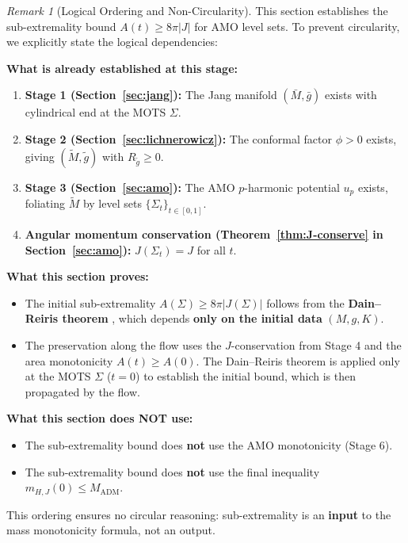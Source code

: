 \documentclass[12pt]{article}
\theoremstyle{plain}
\theoremstyle{definition}
\theoremstyle{remark}
\newtheorem{remark}[theorem]{Remark}
\begin{document}
\begin{remark}[Logical Ordering and Non-Circularity]
This section establishes the sub-extremality bound $A(t) \geq 8\pi|J|$ for AMO level sets. To prevent circularity, we explicitly state the logical dependencies:

\textbf{What is already established at this stage:}
\begin{enumerate}[label=(\arabic*)]
    \item \textbf{Stage 1 (Section~\ref{sec:jang}):} The Jang manifold $(\bar{M}, \bar{g})$ exists with cylindrical end at the MOTS $\Sigma$.
    \item \textbf{Stage 2 (Section~\ref{sec:lichnerowicz}):} The conformal factor $\phi > 0$ exists, giving $(\tilde{M}, \tilde{g})$ with $R_{\tilde{g}} \geq 0$.
    \item \textbf{Stage 3 (Section~\ref{sec:amo}):} The AMO $p$-harmonic potential $u_p$ exists, foliating $\tilde{M}$ by level sets $\{\Sigma_t\}_{t \in [0,1]}$.
    \item \textbf{Angular momentum conservation (Theorem~\ref{thm:J-conserve} in Section~\ref{sec:amo}):} $J(\Sigma_t) = J$ for all $t$.
\end{enumerate}

\textbf{What this section proves:}
\begin{itemize}
    \item The initial sub-extremality $A(\Sigma) \geq 8\pi|J(\Sigma)|$ follows from the \textbf{Dain--Reiris theorem} \cite{dain2011}, which depends \textbf{only on the initial data} $(M, g, K)$.
    \item The preservation along the flow uses the $J$-conservation from Stage 4 and the area monotonicity $A(t) \ge A(0)$. The Dain--Reiris theorem is applied only at the MOTS $\Sigma$ ($t=0$) to establish the initial bound, which is then propagated by the flow.
\end{itemize}

\textbf{What this section does NOT use:}
\begin{itemize}
    \item The sub-extremality bound does \textbf{not} use the AMO monotonicity (Stage 6).
    \item The sub-extremality bound does \textbf{not} use the final inequality $m_{H,J}(0) \leq M_{\mathrm{ADM}}$.
\end{itemize}
This ordering ensures no circular reasoning: sub-extremality is an \textbf{input} to the mass monotonicity formula, not an output.
\end{remark}
\end{document}
